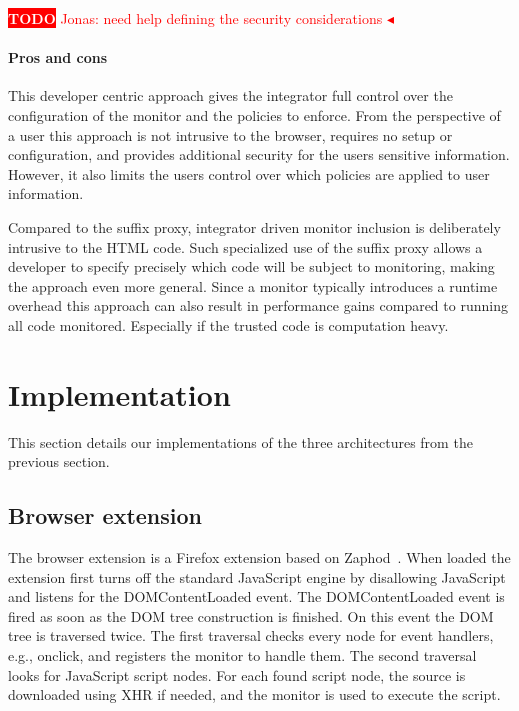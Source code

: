 \documentclass{llncs}
\newcommand{\todo}[1]{\colorbox{red}{\textcolor{white}{\sffamily\bfseries\scriptsize TODO}} \textcolor{red}{#1} \textcolor{red}{$\blacktriangleleft$}}
\begin{document}
\todo{Jonas: need help defining the security considerations}

\paragraph{Pros and cons}

This developer centric approach gives the integrator full control over the 
configuration of the monitor and the policies to enforce. From the perspective of a user this 
approach is not intrusive to the browser, requires no setup or configuration, 
and provides additional security for the users sensitive information. However, 
it also limits the users control over which policies are applied to user information. 

Compared to the suffix proxy, integrator driven monitor 
inclusion is deliberately intrusive to the HTML code. Such specialized use of the suffix 
proxy allows a developer to specify precisely which code will be subject to 
monitoring, making the approach even more general. 
Since a monitor typically introduces a runtime overhead this approach can also 
result in performance gains compared to running all code monitored. Especially 
if the trusted code is computation heavy.



\section{Implementation}
\label{sec:impl}

This section details our implementations of the three architectures
from the previous section. 


\subsection{Browser extension}

The browser extension is a Firefox extension based on Zaphod~\cite{Zaphod}.
When loaded the extension first turns off the standard JavaScript engine by
disallowing JavaScript and listens for the DOMContentLoaded event.  The
DOMContentLoaded event is fired as soon as the DOM tree construction is
finished.  On this event the DOM tree is traversed twice. The first traversal
checks every node for event handlers, e.g., onclick, and registers the monitor
to handle them. The second traversal looks for JavaScript script nodes.  For
each found script node, the source is downloaded using XHR if needed, and the
monitor is used to execute the script.
\end{document}
